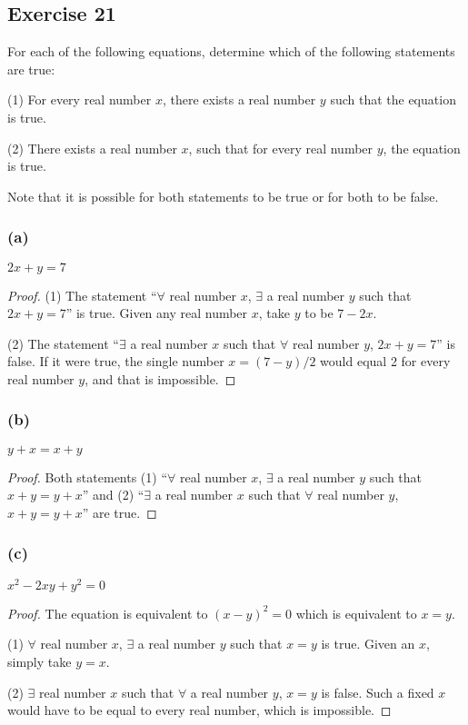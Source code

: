 \documentclass[14pt]{extarticle}
\newcommand{\fa}{\forall}
\newcommand{\te}{\exists}
\begin{document}
\subsection{Exercise 21}
For each of the following equations, determine which of the following statements are true:

(1) For every real number $x$, there exists a real number $y$ such that the equation is true.

(2) There exists a real number $x$, such that for every real number $y$, the equation is true.

Note that it is possible for both statements to be true or for both to be false.

\subsubsection{(a)}
$2x + y = 7$

\begin{proof}
    (1) The statement “$\fa$ real number $x$, $\te$ a real number $y$ such that $2x + y = 7$” is true. Given any real number $x$, take $y$ to be $7 - 2x$.

    (2) The statement “$\te$ a real number $x$ such that $\fa$ real number $y$, $2x + y = 7$” is false. If it were true, the single number $x = (7 - y) / 2$ would equal 2 for every real number $y$, and that is impossible.
\end{proof}

\subsubsection{(b)}
$y + x = x + y$

\begin{proof}
    Both statements (1) “$\fa$ real number $x$, $\te$ a real
    number $y$ such that $x + y = y + x$” and (2) “$\te$ a real
    number $x$ such that $\fa$ real number $y$, $x + y = y + x$” are true.
\end{proof}

\subsubsection{(c)}
$x^2 - 2xy + y^2 = 0$

\begin{proof}
    The equation is equivalent to $(x - y)^2 = 0$ which is equivalent to $x = y$.

    (1) $\fa$ real number $x$, $\te$ a real number $y$ such that $x = y$ is true. Given an $x$, simply take $y = x$.

    (2) $\te$ real number $x$ such that $\fa$ a real number $y$, $x = y$ is false. Such a fixed $x$ would have to be equal to every real number, which is impossible.
\end{proof}
\end{document}
